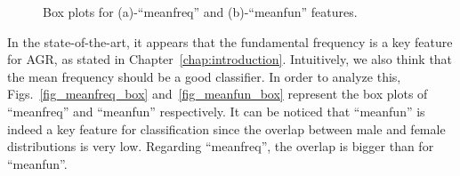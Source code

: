 \begin{figure}[htb]
	\hfill%
	\hfill%
	\hfill\null%
	\caption{Box plots for (a)-``meanfreq'' and (b)-``meanfun'' features.}
	\label{fig_mean_freq}
\end{figure}

In the state-of-the-art, it appears that the fundamental frequency is a key feature for AGR, as stated in Chapter~\ref{chap:introduction}. Intuitively, we also think that the mean frequency should be a good classifier. In order to analyze this, Figs.~\ref{fig_meanfreq_box} and~\ref{fig_meanfun_box} represent the box plots of ``meanfreq'' and ``meanfun'' respectively. 
It can be noticed that ``meanfun'' is indeed a key feature for classification since the overlap between male and female distributions is very low. Regarding ``meanfreq'', the overlap is bigger than for ``meanfun''. 

